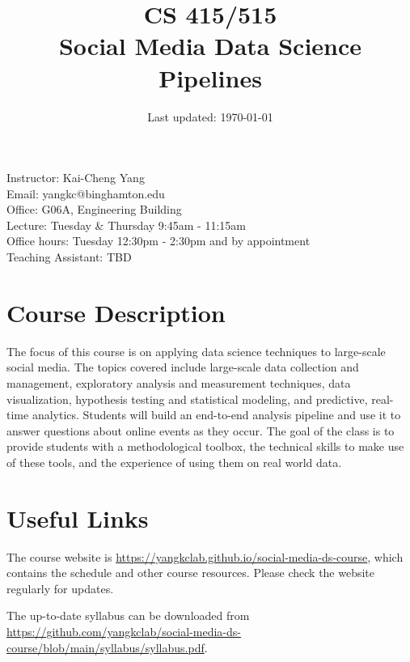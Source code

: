 \documentclass[11pt,article,oneside]{memoir} %
\makeatletter
\def\myauthor{Author}
\def\mytitle{Title}
\def\myemail{yangkc@binghamton.edu}
\def\myauthor{Kai-Cheng Yang}
\def\mytitle{{\normalsize CS 415/515} \\ \HUGE{} Social Media Data Science Pipelines}
\makeatother
\begin{document}

\title{\LARGE \mytitle} %
\date{Last updated: \today}


\maketitle

Instructor: \myauthor \\
Email: \myemail\\
Office: G06A, Engineering Building \\
Lecture: Tuesday \& Thursday 9:45am - 11:15am \\
Office hours: Tuesday 12:30pm - 2:30pm and by appointment \\

Teaching Assistant: TBD \\

\section{Course Description}%

The focus of this course is on applying data science techniques to large-scale social media.
The topics covered include large-scale data collection and management, exploratory analysis and measurement techniques, data visualization, hypothesis testing and statistical modeling, and predictive, real-time analytics.
Students will build an end-to-end analysis pipeline and use it to answer questions about online events as they occur.
The goal of the class is to provide students with a methodological toolbox, the technical skills to make use of these tools, and the experience of using them on real world data.


\section{Useful Links}

The course website is \url{https://yangkclab.github.io/social-media-ds-course}, which contains the schedule and other course resources.
Please check the website regularly for updates.

The up-to-date syllabus can be downloaded from \url{https://github.com/yangkclab/social-media-ds-course/blob/main/syllabus/syllabus.pdf}.
\end{document}

